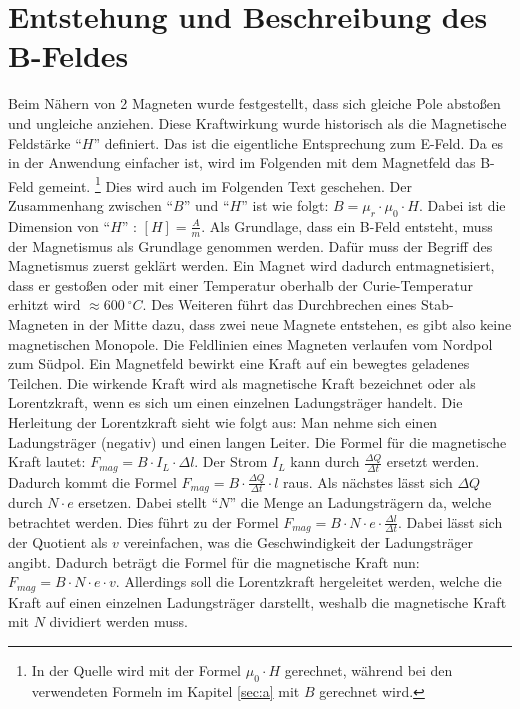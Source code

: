 \section{Entstehung und Beschreibung des B-Feldes}
Beim Nähern von 2 Magneten wurde festgestellt, dass sich gleiche Pole abstoßen und ungleiche anziehen.
Diese Kraftwirkung wurde historisch als die Magnetische Feldstärke "`$H$"' definiert.
Das ist die eigentliche Entsprechung zum E-Feld.
Da es in der Anwendung einfacher ist, wird im Folgenden mit dem Magnetfeld das B-Feld gemeint. \footnote{In der Quelle \cite{Gente1950} wird mit der Formel $\mu_0 \cdot H$ gerechnet, während bei den verwendeten Formeln im Kapitel \ref{sec:a} mit $B$ gerechnet wird.}
Dies wird auch im Folgenden Text geschehen.
Der Zusammenhang zwischen "`$B$"' und "`$H$"' ist wie folgt: $B = \mu_r \cdot \mu_0 \cdot H$.
Dabei ist die Dimension von "`$H$"' : $[H] = \frac{A}{m}$.
Als Grundlage, dass ein B-Feld entsteht, muss der Magnetismus als Grundlage genommen werden.
Dafür muss der Begriff des Magnetismus zuerst geklärt werden.
Ein Magnet wird dadurch entmagnetisiert, dass er gestoßen oder mit einer Temperatur oberhalb der Curie-Temperatur erhitzt wird $ \approx 600 ~ ^\circ C$.
Des Weiteren führt das Durchbrechen eines Stab-Magneten in der Mitte dazu, dass zwei neue Magnete entstehen, es gibt also keine magnetischen Monopole.
Die Feldlinien eines Magneten verlaufen vom Nordpol zum Südpol.
Ein Magnetfeld bewirkt eine Kraft auf ein bewegtes geladenes Teilchen.
Die wirkende Kraft wird als magnetische Kraft bezeichnet oder als Lorentzkraft, wenn es sich um einen einzelnen Ladungsträger handelt.
Die Herleitung der Lorentzkraft sieht wie folgt aus:
Man nehme sich einen Ladungsträger (negativ) und einen langen Leiter.
Die Formel für die magnetische Kraft lautet: $F_{mag} =  B \cdot I_L \cdot \Delta l$.
Der Strom $I_L$ kann durch $\frac{\Delta Q}{\Delta t}$ ersetzt werden.
Dadurch kommt die Formel $F_{mag} = B \cdot \frac{\Delta Q}{\Delta t} \cdot l$ raus.
Als nächstes lässt sich $\Delta Q$ durch $N \cdot e$ ersetzen.
Dabei stellt "`$N$"' die Menge an Ladungsträgern da, welche betrachtet werden.
Dies führt zu der Formel $F_{mag} = B \cdot N \cdot e \cdot \frac{\Delta l}{\Delta t}$.
Dabei lässt sich der Quotient als $v$ vereinfachen, was die Geschwindigkeit der Ladungsträger angibt.
Dadurch beträgt die Formel für die magnetische Kraft nun: $F_{mag} = B \cdot N \cdot e \cdot v$.
Allerdings soll die Lorentzkraft hergeleitet werden, welche die Kraft auf einen einzelnen Ladungsträger darstellt, weshalb die magnetische Kraft mit $N$ dividiert werden muss.
